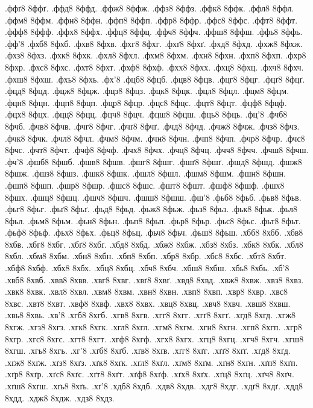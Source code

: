 {.ффґ8 8ффґ.
.ффд8 8ффд.
.ффж8 8ффж.
.ффз8 8ффз.
.ффк8 8ффк.
.ффл8 8ффл.
.ффм8 8ффм.
.ффн8 8ффн.
.ффп8 8ффп.
.ффр8 8ффр.
.ффс8 8ффс.
.ффт8 8ффт.
.ффф8 8ффф.
.ффх8 8ффх.
.ффц8 8ффц.
.ффч8 8ффч.
.ффш8 8ффш.
.ффь8 8ффь.
.фф'8
.фхб8 8фхб.
.фхв8 8фхв.
.фхг8 8фхг.
.фхґ8 8фхґ.
.фхд8 8фхд.
.фхж8 8фхж.
.фхз8 8фхз.
.фхк8 8фхк.
.фхл8 8фхл.
.фхм8 8фхм.
.фхн8 8фхн.
.фхп8 8фхп.
.фхр8 8фхр.
.фхс8 8фхс.
.фхт8 8фхт.
.фхф8 8фхф.
.фхх8 8фхх.
.фхц8 8фхц.
.фхч8 8фхч.
.фхш8 8фхш.
.фхь8 8фхь.
.фх'8
.фцб8 8фцб.
.фцв8 8фцв.
.фцг8 8фцг.
.фцґ8 8фцґ.
.фцд8 8фцд.
.фцж8 8фцж.
.фцз8 8фцз.
.фцк8 8фцк.
.фцл8 8фцл.
.фцм8 8фцм.
.фцн8 8фцн.
.фцп8 8фцп.
.фцр8 8фцр.
.фцс8 8фцс.
.фцт8 8фцт.
.фцф8 8фцф.
.фцх8 8фцх.
.фцц8 8фцц.
.фцч8 8фцч.
.фцш8 8фцш.
.фць8 8фць.
.фц'8
.фчб8 8фчб.
.фчв8 8фчв.
.фчг8 8фчг.
.фчґ8 8фчґ.
.фчд8 8фчд.
.фчж8 8фчж.
.фчз8 8фчз.
.фчк8 8фчк.
.фчл8 8фчл.
.фчм8 8фчм.
.фчн8 8фчн.
.фчп8 8фчп.
.фчр8 8фчр.
.фчс8 8фчс.
.фчт8 8фчт.
.фчф8 8фчф.
.фчх8 8фчх.
.фчц8 8фчц.
.фчч8 8фчч.
.фчш8 8фчш.
.фч'8
.фшб8 8фшб.
.фшв8 8фшв.
.фшг8 8фшг.
.фшґ8 8фшґ.
.фшд8 8фшд.
.фшж8 8фшж.
.фшз8 8фшз.
.фшк8 8фшк.
.фшл8 8фшл.
.фшм8 8фшм.
.фшн8 8фшн.
.фшп8 8фшп.
.фшр8 8фшр.
.фшс8 8фшс.
.фшт8 8фшт.
.фшф8 8фшф.
.фшх8 8фшх.
.фшц8 8фшц.
.фшч8 8фшч.
.фшш8 8фшш.
.фш'8
.фьб8 8фьб.
.фьв8 8фьв.
.фьг8 8фьг.
.фьґ8 8фьґ.
.фьд8 8фьд.
.фьж8 8фьж.
.фьз8 8фьз.
.фьк8 8фьк.
.фьл8 8фьл.
.фьм8 8фьм.
.фьн8 8фьн.
.фьп8 8фьп.
.фьр8 8фьр.
.фьс8 8фьс.
.фьт8 8фьт.
.фьф8 8фьф.
.фьх8 8фьх.
.фьц8 8фьц.
.фьч8 8фьч.
.фьш8 8фьш.
.хбб8 8хбб.
.хбв8 8хбв.
.хбг8 8хбг.
.хбґ8 8хбґ.
.хбд8 8хбд.
.хбж8 8хбж.
.хбз8 8хбз.
.хбк8 8хбк.
.хбл8 8хбл.
.хбм8 8хбм.
.хбн8 8хбн.
.хбп8 8хбп.
.хбр8 8хбр.
.хбс8 8хбс.
.хбт8 8хбт.
.хбф8 8хбф.
.хбх8 8хбх.
.хбц8 8хбц.
.хбч8 8хбч.
.хбш8 8хбш.
.хбь8 8хбь.
.хб'8
.хвб8 8хвб.
.хвв8 8хвв.
.хвг8 8хвг.
.хвґ8 8хвґ.
.хвд8 8хвд.
.хвж8 8хвж.
.хвз8 8хвз.
.хвк8 8хвк.
.хвл8 8хвл.
.хвм8 8хвм.
.хвн8 8хвн.
.хвп8 8хвп.
.хвр8 8хвр.
.хвс8 8хвс.
.хвт8 8хвт.
.хвф8 8хвф.
.хвх8 8хвх.
.хвц8 8хвц.
.хвч8 8хвч.
.хвш8 8хвш.
.хвь8 8хвь.
.хв'8
.хгб8 8хгб.
.хгв8 8хгв.
.хгг8 8хгг.
.хгґ8 8хгґ.
.хгд8 8хгд.
.хгж8 8хгж.
.хгз8 8хгз.
.хгк8 8хгк.
.хгл8 8хгл.
.хгм8 8хгм.
.хгн8 8хгн.
.хгп8 8хгп.
.хгр8 8хгр.
.хгс8 8хгс.
.хгт8 8хгт.
.хгф8 8хгф.
.хгх8 8хгх.
.хгц8 8хгц.
.хгч8 8хгч.
.хгш8 8хгш.
.хгь8 8хгь.
.хг'8
.хґб8 8хґб.
.хґв8 8хґв.
.хґг8 8хґг.
.хґґ8 8хґґ.
.хґд8 8хґд.
.хґж8 8хґж.
.хґз8 8хґз.
.хґк8 8хґк.
.хґл8 8хґл.
.хґм8 8хґм.
.хґн8 8хґн.
.хґп8 8хґп.
.хґр8 8хґр.
.хґс8 8хґс.
.хґт8 8хґт.
.хґф8 8хґф.
.хґх8 8хґх.
.хґц8 8хґц.
.хґч8 8хґч.
.хґш8 8хґш.
.хґь8 8хґь.
.хґ'8
.хдб8 8хдб.
.хдв8 8хдв.
.хдг8 8хдг.
.хдґ8 8хдґ.
.хдд8 8хдд.
.хдж8 8хдж.
.хдз8 8хдз.
}
